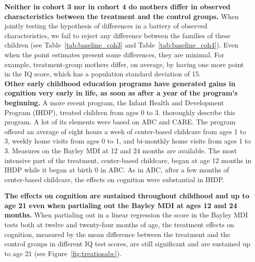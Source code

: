 \noindent \textbf{Neither in cohort 3 nor in cohort 4 do mothers differ in observed characteristics between the treatment and the control groups.} When jointly testing the hypothesis of differences in a battery of observed characteristics, we fail to reject any difference between the families of these children (see Table~\ref{tab:baseline_coh3} and Table~\ref{tab:baseline_coh4}). Even when the point estimates present some differences, they are minimal. For example, treatment-group mothers differ, on average, by having one more point in the IQ score, which has a population standard deviation of 15.\\

\noindent \textbf{Other early childhood education programs have generated gains in cognition very early in life, as soon as after a year of the program's beginning.} A more recent program, the Infant Health and Development Program (IHDP), treated children from ages 0 to 3. \citet{Gross_Spiker_etal_1997_BOOKHelpinglowbirth} thoroughly describe this program. A lot of its elements were based on ABC and CARE. The program offered an average of eight hours a week of center-based childcare from ages 1 to 3, weekly home visits from ages 0 to 1, and bi-monthly home visits from ages 1 to 3. Measures on the Bayley MDI at 12 and 24 months are available. The most intensive part of the treatment, center-based childcare, began at age 12 months in IHDP while it began at birth 0 in ABC. As in ABC, after a few months of center-based childcare, the effects on cognition were substantial in IHDP.


\noindent \textbf{The effects on cognition are sustained throughout childhood and up to age 21 even when partialing out the Bayley MDI at ages 12 and 24 months.} When partialing out in a linear regression the score in the Bayley MDI tests both at twelve and twenty-four months of age, the treatment effects on cognition, measured by the mean difference between the treatment and the control groups in different IQ test scores, are still significant and are sustained up to age 21 (see Figure~\ref{fig:treatiqsabc}).


